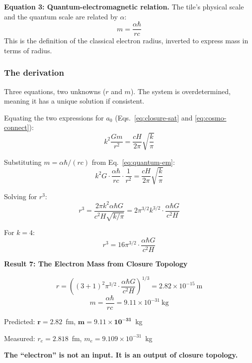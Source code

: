 \documentclass[aps,prd,preprint,superscriptaddress,showpacs,preprintnumbers,amsmath,amssymb,nofootinbib]{revtex4-2}
\begin{document}
\textbf{Equation 3: Quantum-electromagnetic relation.} The tile's physical scale and the quantum scale are related by $\alpha$:
\begin{equation}
m = \frac{\alpha \hbar}{rc}
\label{eq:quantum-em}
\end{equation}
This is the definition of the classical electron radius, inverted to express mass in terms of radius.

\subsubsection*{The derivation}

Three equations, two unknowns ($r$ and $m$). The system is overdetermined, meaning it has a unique solution if consistent.

Equating the two expressions for $a_0$ (Eqs.~\ref{eq:closure-sat} and \ref{eq:cosmo-connect}):
\begin{equation}
k^2 \frac{Gm}{r^2} = \frac{cH}{2\pi} \sqrt{\frac{k}{\pi}}
\end{equation}

Substituting $m = \alpha\hbar/(rc)$ from Eq.~\ref{eq:quantum-em}:
\begin{equation}
k^2 G \cdot \frac{\alpha\hbar}{rc} \cdot \frac{1}{r^2} = \frac{cH}{2\pi} \sqrt{\frac{k}{\pi}}
\end{equation}

Solving for $r^3$:
\begin{equation}
r^3 = \frac{2\pi k^2 \alpha \hbar G}{c^2 H \sqrt{k/\pi}} = 2\pi^{3/2} k^{3/2} \cdot \frac{\alpha \hbar G}{c^2 H}
\label{eq:r-cubed}
\end{equation}

For $k = 4$:
\begin{equation}
r^3 = 16 \pi^{3/2} \cdot \frac{\alpha \hbar G}{c^2 H}
\end{equation}

\vspace{1.5em}
\noindent
\colorbox{resultgreen}{\parbox{\dimexpr\textwidth-2\fboxsep\relax}{%
\vspace{0.8em}
\centering
\textbf{\large Result 7: The Electron Mass from Closure Topology}

\vspace{0.5em}
\boldmath
\begin{equation}
r = \left( (3+1)^2 \pi^{3/2} \cdot \frac{\alpha \hbar G}{c^2 H} \right)^{1/3} = 2.82 \times 10^{-15}~\text{m}
\end{equation}
\begin{equation}
m = \frac{\alpha \hbar}{rc} = 9.11 \times 10^{-31}~\text{kg}
\end{equation}
\unboldmath

\vspace{0.3em}
Predicted: $\bm{r = 2.82}$~fm, $\bm{m = 9.11 \times 10^{-31}}$~kg

Measured: $r_e = 2.818$~fm, $m_e = 9.109 \times 10^{-31}$~kg

\textbf{The ``electron'' is not an input. It is an output of closure topology.}
\vspace{0.5em}
}}
\vspace{1cm}
\end{document}
